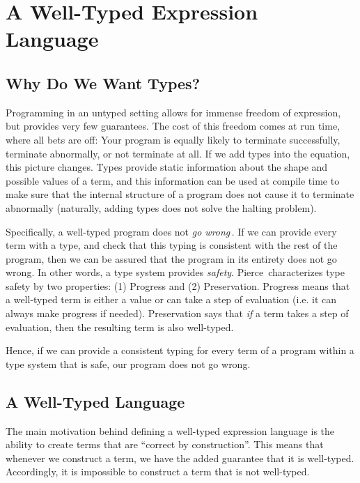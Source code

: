 \section{A Well-Typed Expression Language}
\label{sec:a-well-typed-expression-language}

\subsection{Why Do We Want Types?}
Programming in an untyped setting allows for immense freedom of expression, but provides very few guarantees. The cost of this freedom comes at run time, where all bets are off: Your program is equally likely to terminate successfully, terminate abnormally, or not terminate at all. If we add types into the equation, this picture changes. Types provide static information about the shape and possible values of a term, and this information can be used at compile time to make sure that the internal structure of a program does not cause it to terminate abnormally (naturally, adding types does not solve the halting problem).

Specifically, a well-typed program does not \emph{go wrong}\,\cite{Milner78atheory}. If we can provide every term with a type, and check that this typing is consistent with the rest of the program, then we can be assured that the program in its entirety does not go wrong. In other words, a type system provides \emph{safety}. Pierce\,\cite[Section~8.3]{Pierce:TypeSystems} characterizes type safety by two properties: (1) Progress and (2) Preservation. Progress means that a well-typed term is either a value or can take a step of evaluation (i.e. it can always make progress if needed). Preservation says that \emph{if} a term takes a step of evaluation, then the resulting term is also well-typed.

Hence, if we can provide a consistent typing for every term of a program within a type system that is safe, our program does not go wrong. 

\subsection{A Well-Typed Language}
The main motivation behind defining a well-typed expression language is the ability to create terms that are ``correct by construction''. This means that whenever we construct a term, we have the added guarantee that it is well-typed. Accordingly, it is impossible to construct a term that is not well-typed.

